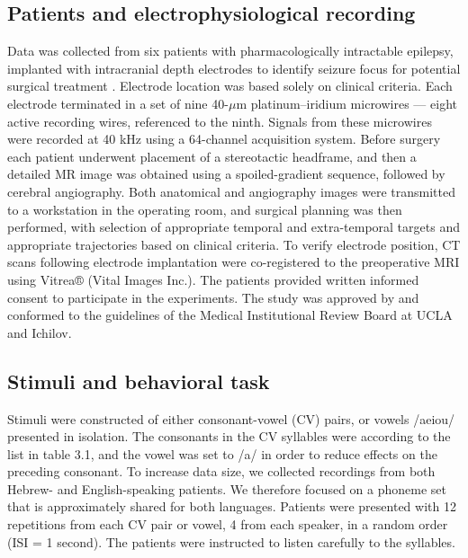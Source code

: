 \subsection{Patients and electrophysiological recording}
Data was collected from six patients with pharmacologically intractable epilepsy, implanted with intracranial depth electrodes to identify seizure focus for potential surgical treatment \citep{mukamel2012human}. Electrode location was based solely on clinical criteria. Each electrode terminated in a set of nine 40-$\mu$m platinum–iridium microwires \citep{fried1999cerebral} — eight active recording wires, referenced to the ninth. Signals from these microwires were recorded at 40 kHz using a 64-channel acquisition system. Before surgery each patient underwent placement of a stereotactic headframe, and then a detailed MR image was obtained using a spoiled-gradient sequence, followed by cerebral angiography. Both anatomical and angiography images were transmitted to a workstation in the operating room, and surgical planning was then performed, with selection of appropriate temporal and extra-temporal targets and appropriate trajectories based on clinical criteria. To verify electrode position, CT scans following electrode implantation were co-registered to the preoperative MRI using Vitrea® (Vital Images Inc.). The patients provided written informed consent to participate in the experiments. The study was approved by and conformed to the guidelines of the Medical Institutional Review Board at UCLA and Ichilov.

\subsection{Stimuli and behavioral task}
Stimuli were constructed of either consonant-vowel (CV) pairs, or vowels /aeiou/ presented in isolation. The consonants in the CV syllables were according to the list in table 3.1, and the vowel was set to /a/ in order to reduce effects on the preceding consonant. To increase data size, we collected recordings from both Hebrew- and English-speaking patients. We therefore focused on a phoneme set that is approximately shared for both languages. Patients  were presented with 12 repetitions from each CV pair or vowel, 4 from each speaker, in a random order (ISI = 1 second). The patients were instructed to listen carefully to the syllables.


